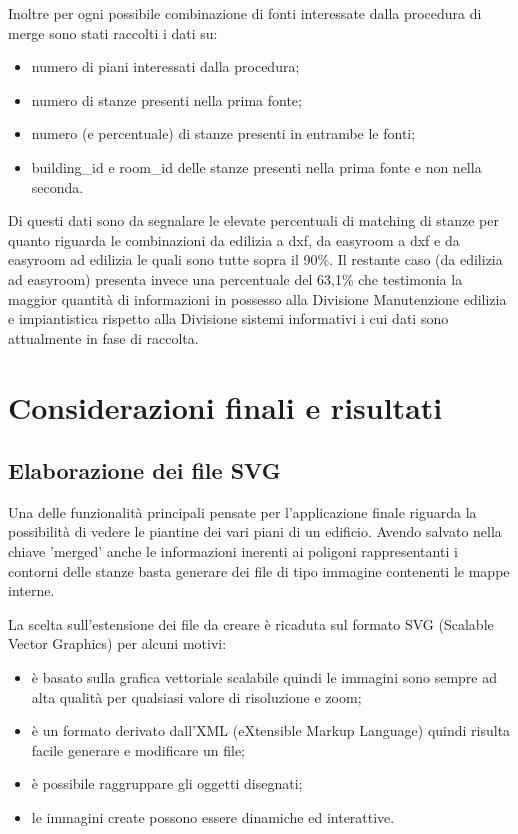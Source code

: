\documentclass[12pt]{report}
\begin{document}
\vspace{5mm} %

Inoltre per ogni possibile combinazione di fonti interessate dalla procedura di merge sono stati raccolti i dati su:
\begin{itemize}
\item numero di piani interessati dalla procedura;
\item numero di stanze presenti nella prima fonte;
\item numero (e percentuale) di stanze presenti in entrambe le fonti;
\item building\_id e room\_id delle stanze presenti nella prima fonte e non nella seconda.
\end{itemize}

Di questi dati sono da segnalare le elevate percentuali di matching di stanze per quanto riguarda le combinazioni da edilizia a dxf, da easyroom a dxf e da easyroom ad edilizia le quali sono tutte sopra il 90\%.
Il restante caso (da edilizia ad easyroom) presenta invece una percentuale del 63,1\% che testimonia la maggior quantità di informazioni in possesso alla Divisione Manutenzione edilizia e impiantistica rispetto alla Divisione sistemi informativi i cui dati sono attualmente in fase di raccolta.


\chapter{Considerazioni finali e risultati}
\label{cap3}

\section{Elaborazione dei file SVG}

Una delle funzionalità principali pensate per l'applicazione finale riguarda la possibilità di vedere le piantine dei vari piani di un edificio.
Avendo salvato nella chiave 'merged' anche le informazioni inerenti ai poligoni rappresentanti i contorni delle stanze basta generare dei file di tipo immagine contenenti le mappe interne.

La scelta sull'estensione dei file da creare è ricaduta sul formato SVG (Scalable Vector Graphics) per alcuni motivi:
\begin{itemize}
\item è basato sulla grafica vettoriale scalabile quindi le immagini sono sempre ad alta qualità per qualsiasi valore di risoluzione e zoom;
\item è un formato derivato dall'XML (eXtensible Markup Language) quindi risulta facile generare e modificare un file;
\item è possibile raggruppare gli oggetti disegnati;
\item le immagini create possono essere dinamiche ed interattive. 
\end{itemize}
\end{document}
